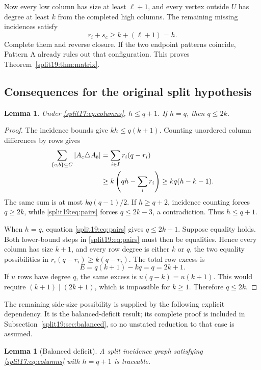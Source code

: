 \documentclass[11pt,a4paper]{article}
\newtheorem{lemma}[theorem]{Lemma}
\theoremstyle{definition}\newtheorem{definition}[theorem]{Definition}
\theoremstyle{remark}\newtheorem{remark}[theorem]{Remark}
\begin{document}
Now every low column has size at least $\ell+1$, and every vertex outside
$U$ has degree at least $k$ from the completed high columns. The remaining
missing incidences satisfy
\[
 r_i+s_c\ge k+(\ell+1)=h.
\]
Complete them and reverse closure. If the two endpoint patterns coincide,
Pattern A already rules out that configuration. This proves
Theorem~\ref{split19:thm:matrix}.

\subsection{Consequences for the original split hypothesis}
\begin{lemma}\label{split19:lem:side-size}
Under \eqref{split17:eq:columns}, $h\le q+1$. If $h=q$, then $q\le2k$.
\end{lemma}
\begin{proof}
The incidence bounds give $kh\le q(k+1)$.
Counting unordered column differences by rows gives
\begin{align}
 \sum_{\{c,b\}\subseteq C}|A_c\triangle A_b|
 &=\sum_{i\in I}r_i(q-r_i)\notag\\
 &\ge k\left(qh-\sum_i r_i\right)
 \ge kq(h-k-1).\label{split19:eq:pairs}
\end{align}
The same sum is at most $kq(q-1)/2$.
If $h\ge q+2$, incidence counting forces $q\ge2k$, while
\eqref{split19:eq:pairs} forces $q\le2k-3$, a contradiction. Thus $h\le q+1$.

When $h=q$, equation \eqref{split19:eq:pairs} gives $q\le2k+1$.
Suppose equality holds. Both lower-bound steps in \eqref{split19:eq:pairs} must
then be equalities. Hence every column has size $k+1$, and every row
degree is either $k$ or $q$, the two equality possibilities in
$r_i(q-r_i)\ge k(q-r_i)$. The total row excess is
\[
 E=q(k+1)-kq=q=2k+1.
\]
If $u$ rows have degree $q$, the same excess is
$u(q-k)=u(k+1)$. This would require $(k+1)\mid(2k+1)$, which is impossible
for $k\ge1$. Therefore $q\le2k$.
\end{proof}

The remaining side-size possibility is supplied by the following explicit
dependency. It is the balanced-deficit result; its complete proof is
included in Subsection~\ref{split19:sec:balanced}, so no unstated reduction to that
case is assumed.
\begin{lemma}[Balanced deficit]\label{split19:lem:balanced}
A split incidence graph satisfying \eqref{split17:eq:columns} with $h=q+1$
is traceable.
\end{lemma}
\end{document}
